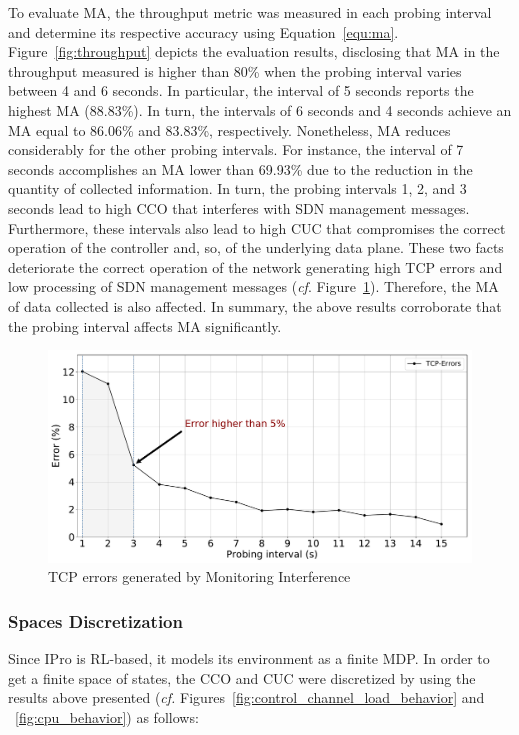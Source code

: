 To evaluate MA, the throughput metric was measured in each probing interval and determine its respective accuracy using Equation~\ref{equ:ma}. Figure~\ref{fig:throughput} depicts the evaluation results, disclosing that MA in the throughput measured is higher than 80\% when the probing interval varies between 4 and 6 seconds. In particular, the interval of 5 seconds reports the highest MA (88.83\%). In turn, the intervals of 6 seconds and 4 seconds achieve an MA equal to 86.06\% and 83.83\%, respectively. Nonetheless, MA reduces considerably for the other probing intervals. For instance, the interval of 7 seconds accomplishes an MA lower than 69.93\% due to the reduction in the quantity of collected information. In turn, the probing intervals 1, 2, and 3 seconds lead to high CCO that interferes with SDN management messages. Furthermore, these intervals also lead to high CUC that compromises the correct operation of the controller and, so, of the underlying data plane. These two facts deteriorate the correct operation of the network generating high TCP errors and low processing of SDN management messages (\textit{cf}. Figure~\ref{fig:tcp-erros}). Therefore, the MA of data collected is also affected. In summary, the above results corroborate that the probing interval affects MA significantly.

\begin{figure}[h!]
    \centering
    \includegraphics[width=1.0\textwidth]{figures/Figure9b-tcp-errors}
    \caption{TCP errors generated by Monitoring Interference}
    \label{fig:tcp-erros}
\end{figure}

\subsubsection{Spaces Discretization}
Since IPro is RL-based, it models its environment as a finite MDP. In order to get a finite space of states, the CCO and CUC were discretized by using the results above presented (\textit{cf.} Figures~\ref{fig:control_channel_load_behavior} and ~\ref{fig:cpu_behavior}) as follows:


